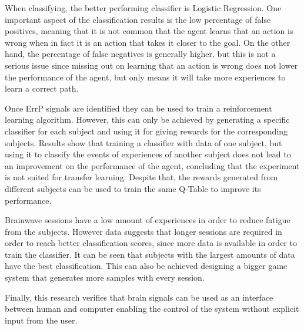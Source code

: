 \documentclass[journal]{IEEEtran}
\begin{document}
When classifying, the better performing classifier is Logistic Regression. One important aspect of the classification results is the low percentage of false positives, meaning that it is not common that the agent learns that an action is wrong when in fact it is an action that takes it closer to the goal. On the other hand, the percentage of false negatives is generally higher, but this is not a serious issue since missing out on learning that an action is wrong does not lower the performance of the agent, but only means it will take more experiences to learn a correct path.

Once ErrP signals are identified they can be used to train a reinforcement learning algorithm. However, this can only be achieved by generating a specific classifier for each subject and using it for giving rewards for the corresponding subjects. Results show that training a classifier with data of one subject, but using it to classify the events of experiences of another subject does not lead to an improvement on the performance of the agent, concluding that the experiment is not suited for transfer learning. Despite that, the rewards generated from different subjects can be used to train the same Q-Table to improve its performance.

Brainwave sessions have a low amount of experiences in order to reduce fatigue from the subjects. However data suggests that longer sessions are required in order to reach better classification scores, since more data is available in order to train the classifier. It can be seen that subjects with the largest amounts of data have the best classification. This can also be achieved designing a bigger game system that generates more samples with every session.

Finally, this research verifies that brain signals can be used as an interface between human and computer enabling the control of the system without explicit input from the user.



\end{document}
